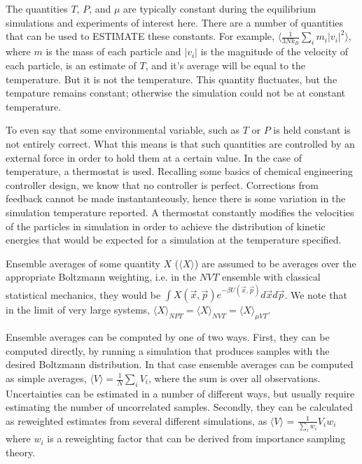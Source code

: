 \documentclass[aps,pre,twocolumn,nofootinbib,superscriptaddress,linenumbers,10pt, draft,tightenlines]{revtex4-1}
\begin{document}
The quantities $T$, $P$, and $\mu$ are typically constant during the
equilibrium simulations and experiments of interest here. 
There are a number of quantities that can
be used to ESTIMATE these constants. For example, $\langle
\frac{1}{3Nk_B}\sum_i m_i |v_i|^2\rangle$, where $m$ is the mass of each
particle and $|v_i|$ is the magnitude of the velocity of each
particle, is an estimate of $T$, and it's average will be equal to
the temperature. But it is not the temperature. This quantity
fluctuates, but the tempature remains constant; otherwise the
simulation could not be at constant temperature.

To even say that some environmental variable, such as $T$ or $P$ is held 
constant is not entirely correct. What this means is that such quantities 
are controlled by an external force in order to hold them at a certain
value. In the case of temperature, a thermostat is used. Recalling some
basics of chemical engineering controller design, we know that no controller
is perfect. Corrections from feedback cannot be made instantanteously, hence 
there is some variation in the simulation temperature reported. 
A thermostat constantly modifies the velocities of the particles
in simulation in order to achieve the distribution of kinetic energies that 
would be expected for a simulation at the temperature specified.

Ensemble averages of some quantity $X$ ($\langle X \rangle$) are
assumed to be averages over the appropriate Boltzmann weighting,
i.e. in the $NVT$ ensemble with classical statistical mechanics, they
would be $\int X(\vec{x},\vec{p}) e^{-\beta U(\vec{x},\vec{p})} d\vec{x}d\vec{p}$. We
note that in the limit of very large systems, ${\langle X \rangle}_{NPT}
= {\langle {X} \rangle}_{NVT} = {\langle {X} \rangle}_{\mu VT}$.

Ensemble averages can be computed by one of two ways. First, they can
be computed directly, by running a simulation that produces samples
with the desired Boltzmann distribution.  In that case ensemble 
averages can be computed as simple averages, ${\langle {V} \rangle} =
\frac{1}{N}\sum_i V_i$, where the sum is over all observations.
Uncertainties can be estimated in a number of different ways, but
usually require estimating the number of uncorrelated
samples. Secondly, they can be calculated as reweighted estimates from
several different simulations, as ${\langle {V} \rangle}$ =
$\frac{1}{\sum_i w_i} V_i w_i$ where $w_i$ is a reweighting factor
that can be derived from importance sampling theory. 
\end{document}
